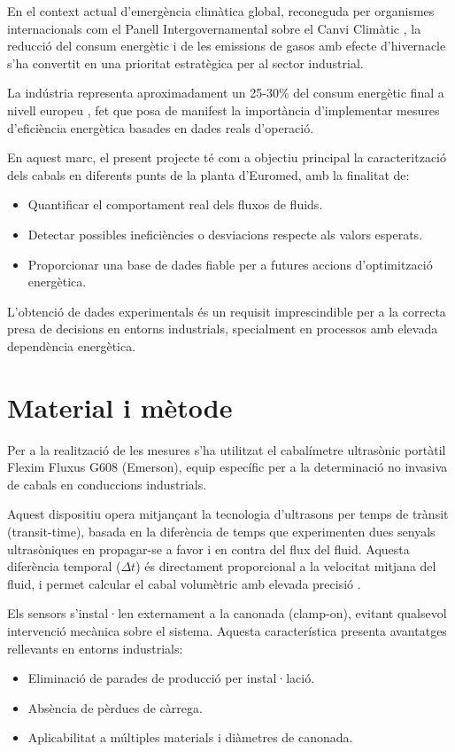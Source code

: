 \documentclass[12pt]{article}
\begin{document}
En el context actual d'emergència climàtica global, reconeguda per organismes internacionals com el Panell Intergovernamental sobre el Canvi Climàtic \cite{EU2023}, la reducció del consum energètic i de les emissions de gasos amb efecte d'hivernacle s'ha convertit en una prioritat estratègica per al sector industrial.

La indústria representa aproximadament un 25-30\% del consum energètic final a nivell europeu \cite{IPCC2023}, fet que posa de manifest la importància d'implementar mesures d'eficiència energètica basades en dades reals d'operació.

En aquest marc, el present projecte té com a objectiu principal la caracterització dels cabals en diferents punts de la planta d'Euromed, amb la finalitat de:

\begin{itemize}
\item Quantificar el comportament real dels fluxos de fluids.
\item Detectar possibles ineficiències o desviacions respecte als valors esperats.
\item Proporcionar una base de dades fiable per a futures accions d'optimització
energètica.
\end{itemize}
    

L’obtenció de dades experimentals és un requisit imprescindible per a la correcta presa de decisions en entorns industrials, specialment en processos amb elevada dependència energètica.

\section{Material i mètode}

Per a la realització de les mesures s'ha utilitzat el cabalímetre ultrasònic portàtil Flexim Fluxus G608 (Emerson), equip específic per a la determinació no invasiva de cabals en conduccions industrials.

Aquest dispositiu opera mitjançant la tecnologia d'ultrasons per temps de trànsit (transit-time), basada en la diferència de temps que experimenten dues senyals ultrasòniques en propagar-se a favor i en contra del flux del fluid. Aquesta diferència temporal ($\Delta t$) és directament proporcional a la velocitat mitjana del fluid, i permet calcular el cabal volumètric amb elevada
 precisió \cite{Emerson2024}.

Els sensors s'instal·len externament a la canonada (clamp-on), evitant qualsevol intervenció mecànica sobre el sistema. Aquesta característica presenta avantatges rellevants en entorns industrials:
\begin{itemize}
\item Eliminació de parades de producció per instal·lació.
\item Absència de pèrdues de càrrega.
\item Aplicabilitat a múltiples materials i diàmetres de canonada.
\end{itemize}
\end{document}
